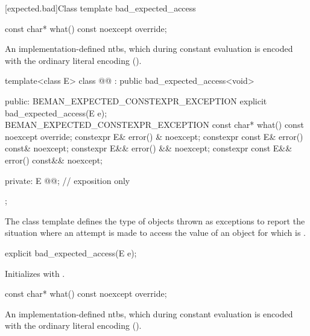 [expected.bad]{Class template bad_expected_access}

%
\begin{itemdecl}
const char* what() const noexcept override;
\end{itemdecl}

\begin{itemdescr}
\pnum
\returns
An implementation-defined ntbs, which during constant evaluation is encoded with the ordinary literal encoding ().
\end{itemdescr}

\begin{codeblock}
template<class E>
class @@ : public bad_expected_access<void> {
public:
  BEMAN_EXPECTED_CONSTEXPR_EXCEPTION explicit bad_expected_access(E e);
  BEMAN_EXPECTED_CONSTEXPR_EXCEPTION const char* what() const noexcept override;
  constexpr E& error() & noexcept;
  constexpr const E& error() const& noexcept;
  constexpr E&& error() && noexcept;
  constexpr const E&& error() const&& noexcept;

private:
  E @@; // exposition only
};
\end{codeblock}

\begin{itemdescr}
\pnum
\remarks
The class template  defines the type of objects thrown as exceptions to report the situation where an attempt is made to access the value of an  object for which  is .
\end{itemdescr}

%
\begin{itemdecl}
explicit bad_expected_access(E e);
\end{itemdecl}

\begin{itemdescr}
\pnum
\effects
Initializes  with .
\end{itemdescr}

%
\begin{itemdecl}
const char* what() const noexcept override;
\end{itemdecl}

\begin{itemdescr}
\pnum
\returns
An implementation-defined ntbs, which during constant evaluation is encoded with the ordinary literal encoding ().
\end{itemdescr}

